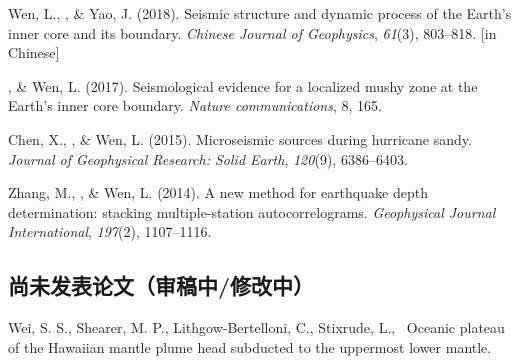 \begin{etaremune}
    Wen, L., \Tian, \& Yao, J. (2018).
    Seismic structure and dynamic process of the Earth's inner core and its boundary.
    \textit{Chinese Journal of Geophysics}, \textit{61}(3), 803--818.
     [in Chinese]
\item
    \Tian, \& Wen, L. (2017).
    Seismological evidence for a localized mushy zone at the Earth's inner core boundary.
    \textit{Nature communications}, 8, 165.
\item
    Chen, X., \Tian, \& Wen, L. (2015).
    Microseismic sources during hurricane sandy.
    \textit{Journal of Geophysical Research: Solid Earth}, \textit{120}(9), 6386--6403.
\item Zhang, M., \Tian, \& Wen, L. (2014).
    A new method for earthquake depth determination: stacking multiple-station autocorrelograms.
    \textit{Geophysical Journal International}, \textit{197}(2), 1107--1116.\\
\end{etaremune}

\subsection*{尚未发表论文（审稿中/修改中）}
\begin{etaremune}
\item Wei, S. S., Shearer, M. P., Lithgow-Bertelloni, C., Stixrude, L., \Tian \
	Oceanic plateau of the Hawaiian mantle plume head subducted to the uppermost lower mantle.
\end{etaremune}

